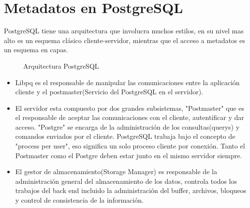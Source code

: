 \section{Metadatos en PostgreSQL}
PostgreSQL tiene una arquitectura que involucra muchos estilos, en su nivel mas alto es un esquema cl\'asico cliente-servidor, mientras que el acceso a metadatos es un esquema en capas.
\begin{figure}[H]
\centering
{}
\caption{Arquitectura PostgreSQL} \label{fig:ArquitecturaPostgres}
\end{figure}
\begin{itemize}
\item Libpq es el responsable de manipular las comunicaciones entre la aplicaci\'on cliente y el postmaster(Servicio del PostgreSQL en el servidor).
\item El servidor esta compuesto por dos grandes subsistemas, "Postmaster" que es el responsable de aceptar las comunicaciones con el cliente, autentificar y dar acceso. "Postgre" se encarga de la administraci\'on de los consultas(querys) y comandos enviados por el cliente. PostgreSQL trabaja bajo el concepto de "process per user", eso significa un solo proceso cliente por conexi\'on. Tanto el Postmaster como el Postgre deben estar junto en el mismo servidor siempre.
\item El gestor de almacenamiento(Storage Manager) es responsable de la administraci\'on general del almacenamiento de los datos, controla todos los trabajos del back end incluido la administraci\'on del buffer, archivos, bloqueos y control de consistencia de la informaci\'on.   
\end{itemize}
